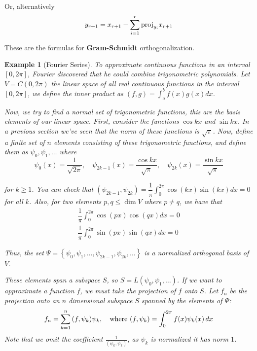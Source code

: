 \documentclass{book}
\newtheorem{example}{Example}[section]
\begin{document}
Or, alternatively
\begin{equation}
    y_{r+1} = x_{r+1} - \sum_{i=1}^{r}{\textnormal{proj}_{y_i}{x_{r+1}}}
\end{equation}

These are the formulas for \textbf{Gram-Schmidt} orthogonalization.

\begin{example}[Fourier Series]
    To approximate continuous functions in an interval $\left[0,2\pi\right]$, Fourier discovered that
    he could combine trigonometric polynomials. Let $V=C(0,2\pi)$ the linear space of all real continuous functions
    in the interval $\left[0,2\pi\right]$, we define the inner product as $\left(f,g\right) = \int_{a}^{b}{f(x)g(x)dx}$.

    Now, we try to find a normal set of trigonometric functions, this are the basis
    elements of our linear space. First, consider the functions $\cos{kx}$ and
    $\sin{kx}$. In a previous section we've seen that the norm of these functions
    is $\sqrt \pi$. Now, define a finite set of $n$ elements consisting of these
    trigonometric functions, and define them as $\psi_0, \psi_1, \dots$ where
    \begin{equation}
        \psi_0(x) = \dfrac{1}{\sqrt{2\pi}}, \quad \psi_{2k-1}(x) = \dfrac{\cos{kx}}{\sqrt{\pi}}, \quad \psi_{2k}(x) = \dfrac{\sin{kx}}{\sqrt{\pi}}
    \end{equation}

    for $k \geq 1$. You can check that $\left(\psi_{2k-1},
        \psi_{2k}\right)=\dfrac{1}{\pi}\int_{0}^{2\pi}{\cos{(kx)}\sin{(kx)}dx} = 0$ for
    all $k$. Also, for two elements $p,q\leq \dim V$ where $p\neq q$, we have that
    \begin{equation}
        \begin{split}
            \dfrac{1}{\pi}\int_{0}^{2\pi}{\cos(px)\cos(qx)dx} = 0 \\[1em]
            \dfrac{1}{\pi}\int_{0}^{2\pi}{\sin(px)\sin(qx)dx} = 0
        \end{split}
    \end{equation}

    Thus, the set $\Psi =
        \left\{\psi_0,\psi_1,\dots,\psi_{2k-1},\psi_{2k},\dots\right\}$ is a normalized
    orthogonal basis of $V$.

    These elements span a subspace $S$, so $S = L\left(\psi_0,\psi_1,\dots\right)$.
    If we want to approximate a function $f$, we must take the projection of $f$
    onto $S$. Let $f_n$ be the projection onto an $n$ dimensional subspace $S$
    spanned by the elements of $\Psi$:
    \begin{equation}
        f_n = \sum_{k=1}^{n}{(f, \psi_k)\psi_k}, \quad\textnormal{where }(f,\psi_k) = \int_{0}^{2\pi}{f(x)\psi_k(x)\,dx}
    \end{equation}
    Note that we omit the coefficient $\frac{1}{(\psi_k,\psi_k)}$, as $\psi_k$ is normalized it has norm $1$.


\end{example}
\end{document}
